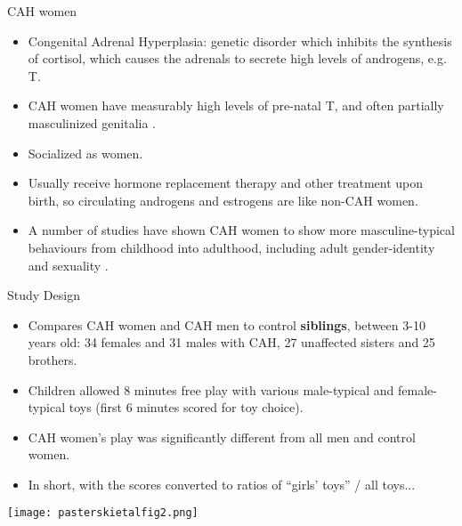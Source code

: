 \documentclass[hyperref={pdfpagelabels=false}]{beamer}
\begin{document}
\begin{frame}{CAH women}
	\begin{itemize}
	\item Congenital Adrenal Hyperplasia: genetic disorder which inhibits the synthesis of cortisol, which causes the adrenals to secrete high levels of androgens, e.g. T.
	\item CAH women have measurably high levels of pre-natal T, and often partially masculinized genitalia \citep[][and refs therein]{pasterskietal2005, balthazart2011}.
	\item Socialized as women.
	\item Usually receive hormone replacement therapy and other treatment upon birth, so circulating androgens and estrogens are like non-CAH women.
	\item A number of studies have shown CAH women to show more masculine-typical behaviours from childhood into adulthood, including adult gender-identity and sexuality \citep[see][for reviews]{hines2006, balthazart2011}.
	\end{itemize}
\end{frame}

\begin{frame}{\citet{pasterskietal2005}}
\begin{block}{Study Design}

	\begin{itemize}
	\item Compares CAH women and CAH men to control \textbf{siblings}, between 3-10 years old: 34 females and 31 males with CAH, 27 unaffected sisters and 25 brothers.
	\item Children allowed 8 minutes free play with various male-typical and female-typical toys (first 6 minutes scored for toy choice).
	\item CAH women's play was significantly different from all men and control women.
	\item In short, with the scores converted to ratios of ``girls' toys'' / all toys...
	\end{itemize}
	\end{block}
\end{frame}



\begin{frame}{}
\begin{center}
	\texttt{[image: pasterskietalfig2.png]}
	\end{center}
\end{frame}
\end{document}
